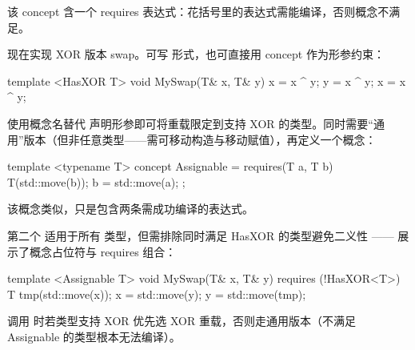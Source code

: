 该 concept 含一个 requires 表达式：花括号里的表达式需能编译，否则概念不满足。

现在实现 XOR 版本 swap。可写  形式，也可直接用 concept 作为形参约束：

\begin{code}
template <HasXOR T> void MySwap(T& x, T& y) {
     x = x ^ y;
     y = x ^ y;
     x = x ^ y;
}
\end{code}

使用概念名替代  声明形参即可将重载限定到支持 XOR 的类型。同时需要“通用”版本（但非任意类型——需可移动构造与移动赋值），再定义一个概念：

\begin{code}
template <typename T> concept Assignable =
  requires(T a, T b) {
    T(std::move(b));
    b = std::move(a);
  };
\end{code}

该概念类似，只是包含两条需成功编译的表达式。

第二个  适用于所有  类型，但需排除同时满足 HasXOR 的类型避免二义性 —— 展示了概念占位符与 requires 组合：

\begin{code}
template <Assignable T> void MySwap(T& x, T& y)
  requires (!HasXOR<T>)
{
  T tmp(std::move(x));
  x = std::move(y);
  y = std::move(tmp);
}
\end{code}

调用  时若类型支持 XOR 优先选 XOR 重载，否则走通用版本（不满足 Assignable 的类型根本无法编译）。

